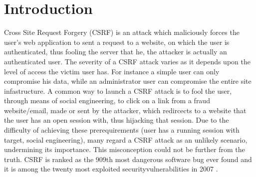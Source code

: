 \section{Introduction} 


Cross Site Request Forgery (CSRF) is an attack which maliciously forces the user's web application to sent a
request to a website, on which the user is authenticated, thus fooling the server that he, the attacker is 
actually an authenticated user.  The severity of a CSRF attack varies as it depends upon the level of access
the victim user has. For instance a simple user can only compromise his data, while an administrator user can
compromise the entire site infastructure.  A common way to launch a CSRF attack is to fool the user, through
means of social engineering, to click on a link from a fraud website/email, made or sent by the attacker, 
which redircects to a website that the user has an open session with, thus hijacking that session.  Due to
the difficulty of achieving these prerequirements (user has a running session with target, social engineering),
many regard a CSRF attack as an unlikely scenario, undermining its importance.  This misconception could not
be further from the truth.  CSRF is ranked as the 909th most dangerous software bug ever found \cite{website:wiki-csrf-sever}
and it is among the twenty most exploited security\-vulnerabilities in 2007 \cite{Dhamija:2006:WPW:1124772.1124861}.


